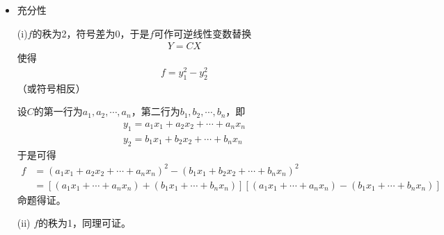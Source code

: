 \documentclass{article}
\begin{document}
\begin{itemize}
        (ii) $a_1 x_1 + a_2 x_2 + \cdots + a_n x_n, b_1 x_1 + b_2 x_2 + \cdots + b_n x_n$
        线性无关。
        于是存在可逆矩阵$C$使得
        \begin{align*}
          Y = C X
        \end{align*}
        其中$C$的第一行为$a_1, a_2, \cdots, a_n$，第二行为$b_1, b_2, \cdots, b_n$，即
        \begin{align*}
          y_1 = a_1 x_1 + a_2 x_2 + \cdots + a_n x_n \\
          y_2 = b_1 x_1 + b_2 x_2 + \cdots + b_n x_n
        \end{align*}
        $\therefore f = y_1 y_2$。\\
        作可逆线性变数替换，
        \begin{align*}
          y_1 & = z_1 + z_2 \\
          y_2 & = z_1 - z_2 \\
          y_3 & = z_3       \\
              & \vdots      \\
          y_n & = z_n
        \end{align*}
        $\therefore f = z_1^2 - z_2^2$\\
        $\therefore f$的秩为2，符号差为0

  \item 充分性

        (i)$f$的秩为2，符号差为0，于是$f$可作可逆线性变数替换
        \begin{align*}
          Y = C X
        \end{align*}
        使得
        \begin{align*}
          f = y_1^2 - y_2^2
        \end{align*}
        （或符号相反）

        设$C$的第一行为$a_1, a_2, \cdots, a_n$，第二行为$b_1, b_2, \cdots, b_n$，即
        \begin{align*}
          y_1 = a_1 x_1 + a_2 x_2 + \cdots + a_n x_n \\
          y_2 = b_1 x_1 + b_2 x_2 + \cdots + b_n x_n
        \end{align*}
        于是可得
        \begin{align*}
          f & = (a_1 x_1 + a_2 x_2 + \cdots + a_n x_n)^2 - (b_1 x_1 + b_2 x_2 + \cdots + b_n x_n)^2                                         \\
            & = [(a_1 x_1 + \cdots + a_n x_n) + (b_1 x_1 + \cdots + b_n x_n)] [(a_1 x_1 + \cdots + a_n x_n) - (b_1 x_1 + \cdots + b_n x_n)]
        \end{align*}
        命题得证。

        (ii) $f$的秩为1，同理可证。

\end{itemize}
\end{document}

